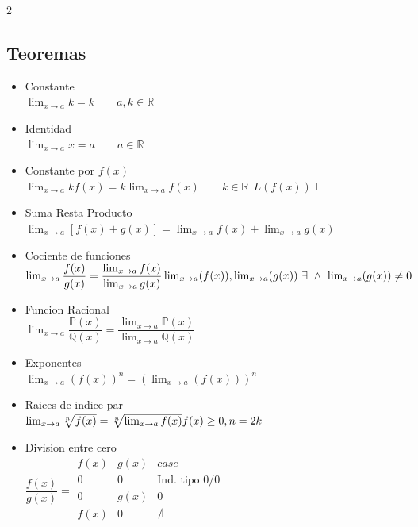 \begin{multicols}{2}
\begin{enumerate}
\begin{itemize}
                  \end{itemize}
              \end{enumerate}
              \columnbreak

              \subsection{Teoremas}
              \begin{itemize}
                \item Constante\\
                  $\lim_{x \to a} k = k \quad \quad a,k \in \mathbb{R}$
                \item Identidad\\
                  $\lim_{x \to a} x = a \quad \quad a \in \mathbb{R}$
                \item Constante por $f(x)$\\
                  $\lim_{x \to a} kf(x) = k\lim_{x \to a} f(x) \quad \quad k \in \mathbb{R}\ \ L(f(x)) \exists$
                \item Suma Resta Producto\\
                  $\lim_{x \to a} [f(x)\pm g(x)] = \lim_{x \to a} f(x) \pm \lim_{x \to a} g(x) $
                \item Cociente de funciones\\
                  $\lim_{x \to a} \dfrac{f(x)}{g(x)} = \dfrac{\lim_{x \to a} f(x)}{\lim_{x \to a} g(x)} \\\lim_{x\to a}(f(x)), \lim_{x\to a}(g(x)) \ \exists \  \wedge\ \lim_{x\to a}(g(x)) \ne 0 $
                \item Funcion Racional\\
                  $\lim_{x \to a} \dfrac{\mathbb{P}(x)}{\mathbb{Q}(x)}=\dfrac{\lim_{x\to a} \mathbb{P}(x)}{\lim_{x\to a} \mathbb{Q}(x)}$
                \item Exponentes\\
                  $\lim_{x\to a}(f(x))^n=(\lim_{x\to a}(f(x)))^n$
                \item Raices de indice par\\
                  $\lim_{x\to a} \sqrt[n]{f(x)}=\sqrt[n]{\lim_{x\to a} f(x)} \\ f(x) \ge 0, n=2k$
                \item Division entre cero \\
                  $\dfrac{f(x)}{g(x)}=
                  \begin{matrix}
                    f(x) & g(x) & case \\
                    0 & 0 &\text{Ind. tipo } 0/0 \\
                    0 & g(x)  & 0\\
                    f(x) & 0 & \nexists\\
                  \end{matrix}$
              \end{itemize}


\end{multicols}
